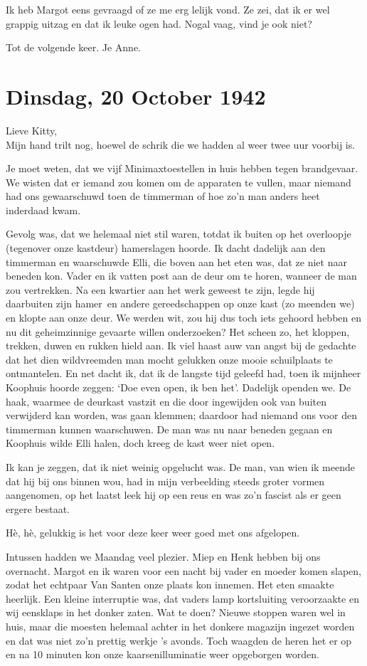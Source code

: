 \documentclass{book}
\begin{document}
Ik heb Margot eens gevraagd of ze me erg lelijk vond. Ze zei, dat ik er
wel grappig uitzag en dat ik leuke ogen had. Nogal vaag, vind je ook
niet?

Tot de volgende keer. Je Anne.

\chapter{Dinsdag, 20 October 1942}

Lieve Kitty,\\Mijn hand trilt nog, hoewel de schrik die we hadden al
weer twee uur voorbij is.

Je moet weten, dat we vijf Minimaxtoestellen in huis hebben tegen
brandgevaar. We wisten dat er iemand zou komen om de apparaten te
vullen, maar niemand had ons gewaarschuwd toen de timmerman of hoe zo'n
man anders heet inderdaad kwam.

Gevolg was, dat we helemaal niet stil waren, totdat ik buiten op het
overloopje (tegenover onze kastdeur) hamerslagen hoorde. Ik dacht
dadelijk aan den timmerman en waarschuwde Elli, die boven aan het eten
was, dat ze niet naar beneden kon. Vader en ik vatten post aan de deur
om te horen, wanneer de man zou vertrekken. Na een kwartier aan het werk
geweest te zijn, legde hij daarbuiten zijn hamer~en andere
gereedschappen op onze kast (zo meenden we) en klopte aan onze deur. We
werden wit, zou hij dus toch iets gehoord hebben en nu dit geheimzinnige
gevaarte willen onderzoeken? Het scheen zo, het kloppen, trekken, duwen
en rukken hield aan. Ik viel haast auw van angst bij de gedachte dat het
dien wildvreemden man mocht gelukken onze mooie schuilplaats te
ontmantelen. En net dacht ik, dat ik de langste tijd geleefd had, toen
ik mijnheer Koophuis hoorde zeggen: `Doe even open, ik ben het'.
Dadelijk openden we. De haak, waarmee de deurkast vastzit en die door
ingewijden ook van buiten verwijderd kan worden, was gaan klemmen;
daardoor had niemand ons voor den timmerman kunnen waarschuwen. De man
was nu naar beneden gegaan en Koophuis wilde Elli halen, doch kreeg de
kast weer niet open.

Ik kan je zeggen, dat ik niet weinig opgelucht was. De man, van wien ik
meende dat hij bij ons binnen wou, had in mijn verbeelding steeds groter
vormen aangenomen, op het laatst leek hij op een reus en was zo'n
fascist als er geen ergere bestaat.

Hè, hè, gelukkig is het voor deze keer weer goed met ons afgelopen.

Intussen hadden we Maandag veel plezier. Miep en Henk hebben bij ons
overnacht. Margot en ik waren voor een nacht bij vader en moeder komen
slapen, zodat het echtpaar Van Santen onze plaats kon innemen. Het eten
smaakte heerlijk. Een kleine interruptie was, dat vaders lamp
kortsluiting veroorzaakte en wij eensklaps in het donker zaten. Wat te
doen? Nieuwe stoppen waren wel in huis, maar die moesten helemaal achter
in het donkere magazijn ingezet worden en dat was niet zo'n prettig
werkje 's avonds. Toch waagden de heren het er op en na 10 minuten kon
onze kaarsenilluminatie weer opgeborgen worden.
\end{document}

